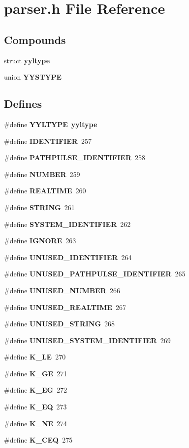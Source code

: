 \section{parser.h File Reference}
\label{parser_8h}
\subsection*{Compounds}
\begin{CompactItemize}
\item 
struct {\bf yyltype}
\item 
union {\bf YYSTYPE}
\end{CompactItemize}
\subsection*{Defines}
\begin{CompactItemize}
\item 
\#define {\bf YYLTYPE}\ {\bf yyltype}
\item 
\#define {\bf IDENTIFIER}\ 257
\item 
\#define {\bf PATHPULSE\_\-IDENTIFIER}\ 258
\item 
\#define {\bf NUMBER}\ 259
\item 
\#define {\bf REALTIME}\ 260
\item 
\#define {\bf STRING}\ 261
\item 
\#define {\bf SYSTEM\_\-IDENTIFIER}\ 262
\item 
\#define {\bf IGNORE}\ 263
\item 
\#define {\bf UNUSED\_\-IDENTIFIER}\ 264
\item 
\#define {\bf UNUSED\_\-PATHPULSE\_\-IDENTIFIER}\ 265
\item 
\#define {\bf UNUSED\_\-NUMBER}\ 266
\item 
\#define {\bf UNUSED\_\-REALTIME}\ 267
\item 
\#define {\bf UNUSED\_\-STRING}\ 268
\item 
\#define {\bf UNUSED\_\-SYSTEM\_\-IDENTIFIER}\ 269
\item 
\#define {\bf K\_\-LE}\ 270
\item 
\#define {\bf K\_\-GE}\ 271
\item 
\#define {\bf K\_\-EG}\ 272
\item 
\#define {\bf K\_\-EQ}\ 273
\item 
\#define {\bf K\_\-NE}\ 274
\item 
\#define {\bf K\_\-CEQ}\ 275
\item 

\end{CompactItemize}
